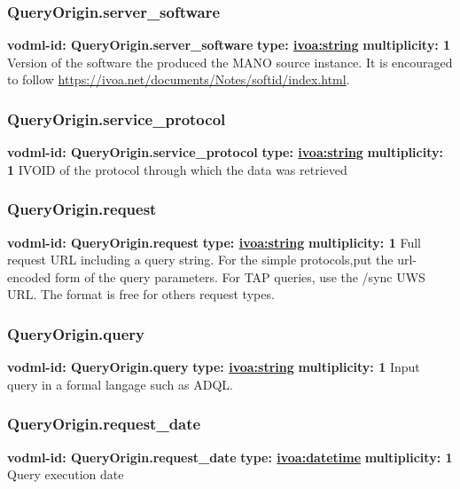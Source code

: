 {    \subsubsection{QueryOrigin.server_software}
      \textbf{vodml-id: QueryOrigin.server_software} \newline
      \textbf{type: \hyperref[sect:ivoa]{ivoa:string}} \newline
      \textbf{multiplicity: 1} \newline 
      Version of the software the produced the MANO source instance. It is encouraged to follow \url{https://ivoa.net/documents/Notes/softid/index.html}.

    \subsubsection{QueryOrigin.service_protocol}
      \textbf{vodml-id: QueryOrigin.service_protocol} \newline
      \textbf{type: \hyperref[sect:ivoa]{ivoa:string}} \newline
      \textbf{multiplicity: 1} \newline 
      IVOID of the protocol through which the data was retrieved

    \subsubsection{QueryOrigin.request}
      \textbf{vodml-id: QueryOrigin.request} \newline
      \textbf{type: \hyperref[sect:ivoa]{ivoa:string}} \newline
      \textbf{multiplicity: 1} \newline 
      Full request URL including a query string. For the simple protocols,put the url-encoded form of the query parameters. For TAP queries, use the /sync UWS URL. The format is free for others request types.

    \subsubsection{QueryOrigin.query}
      \textbf{vodml-id: QueryOrigin.query} \newline
      \textbf{type: \hyperref[sect:ivoa]{ivoa:string}} \newline
      \textbf{multiplicity: 1} \newline 
      Input query in a formal langage such as ADQL.

    \subsubsection{QueryOrigin.request_date}
      \textbf{vodml-id: QueryOrigin.request_date} \newline
      \textbf{type: \hyperref[sect:ivoa]{ivoa:datetime}} \newline
      \textbf{multiplicity: 1} \newline 
      Query execution date

}
